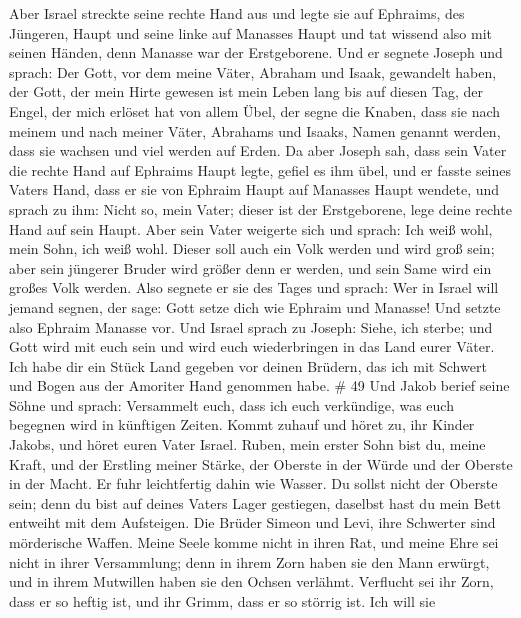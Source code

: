  Aber Israel streckte seine rechte Hand aus und legte sie
auf Ephraims, des Jüngeren, Haupt und seine linke auf Manasses Haupt und
tat wissend also mit seinen Händen, denn Manasse war der Erstgeborene.
 Und er segnete Joseph und sprach: Der Gott, vor dem meine
Väter, Abraham und Isaak, gewandelt haben, der Gott, der mein Hirte
gewesen ist mein Leben lang bis auf diesen Tag,  der Engel,
der mich erlöset hat von allem Übel, der segne die Knaben, dass sie nach
meinem und nach meiner Väter, Abrahams und Isaaks, Namen genannt werden,
dass sie wachsen und viel werden auf Erden.  Da aber Joseph
sah, dass sein Vater die rechte Hand auf Ephraims Haupt legte, gefiel es
ihm übel, und er fasste seines Vaters Hand, dass er sie von Ephraim
Haupt auf Manasses Haupt wendete,  und sprach zu ihm: Nicht
so, mein Vater; dieser ist der Erstgeborene, lege deine rechte Hand auf
sein Haupt.  Aber sein Vater weigerte sich und sprach: Ich
weiß wohl, mein Sohn, ich weiß wohl. Dieser soll auch ein Volk werden
und wird groß sein; aber sein jüngerer Bruder wird größer denn er
werden, und sein Same wird ein großes Volk werden.  Also
segnete er sie des Tages und sprach: Wer in Israel will jemand segnen,
der sage: Gott setze dich wie Ephraim und Manasse! Und setzte also
Ephraim Manasse vor.  Und Israel sprach zu Joseph: Siehe,
ich sterbe; und Gott wird mit euch sein und wird euch wiederbringen in
das Land eurer Väter.  Ich habe dir ein Stück Land gegeben
vor deinen Brüdern, das ich mit Schwert und Bogen aus der Amoriter Hand
genommen habe. \# 49  Und Jakob berief seine Söhne und
sprach: Versammelt euch, dass ich euch verkündige, was euch begegnen
wird in künftigen Zeiten.  Kommt zuhauf und höret zu, ihr
Kinder Jakobs, und höret euren Vater Israel.  Ruben, mein
erster Sohn bist du, meine Kraft, und der Erstling meiner Stärke, der
Oberste in der Würde und der Oberste in der Macht.  Er fuhr
leichtfertig dahin wie Wasser. Du sollst nicht der Oberste sein; denn du
bist auf deines Vaters Lager gestiegen, daselbst hast du mein Bett
entweiht mit dem Aufsteigen.  Die Brüder Simeon und Levi,
ihre Schwerter sind mörderische Waffen.  Meine Seele komme
nicht in ihren Rat, und meine Ehre sei nicht in ihrer Versammlung; denn
in ihrem Zorn haben sie den Mann erwürgt, und in ihrem Mutwillen haben
sie den Ochsen verlähmt.  Verflucht sei ihr Zorn, dass er so
heftig ist, und ihr Grimm, dass er so störrig ist. Ich will sie
